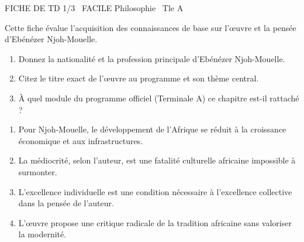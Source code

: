 \documentclass[11pt]{article}
\begin{document}
\begin{tcolorbox}[enhanced,colback=popink,colframe=popink,arc=10pt,boxrule=0pt,left=12pt,right=12pt,top=9pt,bottom=9pt]
{\color{white}\popxbold\small FICHE DE TD 1/3 \textbullet\ FACILE \hfill Philosophie \textbullet\ Tle A\par}
\end{tcolorbox}
\vspace{4pt}
Cette fiche évalue l'acquisition des connaissances de base sur l'œuvre et la pensée d'Ebénézer Njoh-Mouelle.

\begin{exercice}
\begin{enumerate}
    \item Donnez la nationalité et la profession principale d'Ebénézer Njoh-Mouelle.
    \item Citez le titre exact de l'œuvre au programme et son thème central.
    \item À quel module du programme officiel (Terminale A) ce chapitre est-il rattaché ?
\end{enumerate}
\end{exercice}

\begin{exercice}
\begin{enumerate}
    \item Pour Njoh-Mouelle, le développement de l'Afrique se réduit à la croissance économique et aux infrastructures.
    \item La médiocrité, selon l'auteur, est une fatalité culturelle africaine impossible à surmonter.
    \item L'excellence individuelle est une condition nécessaire à l'excellence collective dans la pensée de l'auteur.
    \item L'œuvre propose une critique radicale de la tradition africaine sans valoriser la modernité.
\end{enumerate}
\end{exercice}
\end{document}
